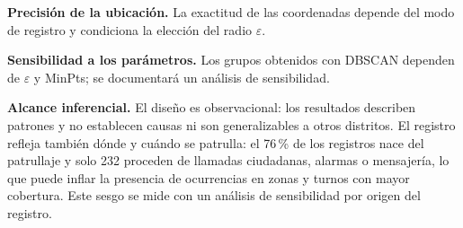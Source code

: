 \textbf{Precisión de la ubicación.} La exactitud de las coordenadas depende del modo de registro y condiciona la elección del radio $\varepsilon$.

\textbf{Sensibilidad a los parámetros.} Los grupos obtenidos con DBSCAN dependen de $\varepsilon$ y MinPts; se documentará un análisis de sensibilidad.

\textbf{Alcance inferencial.} El diseño es observacional: los resultados describen patrones y no establecen causas ni son generalizables a otros distritos. El registro refleja también dónde y cuándo se patrulla: el 76\,\% de los registros nace del patrullaje y solo 232 proceden de llamadas ciudadanas, alarmas o mensajería, lo que puede inflar la presencia de ocurrencias en zonas y turnos con mayor cobertura. Este sesgo se mide con un análisis de sensibilidad por origen del registro.
